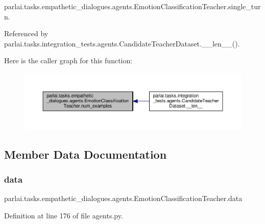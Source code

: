 parlai.\+tasks.\+empathetic\+\_\+dialogues.\+agents.\+Emotion\+Classification\+Teacher.\+single\+\_\+turn.



Referenced by parlai.\+tasks.\+integration\+\_\+tests.\+agents.\+Candidate\+Teacher\+Dataset.\+\_\+\+\_\+len\+\_\+\+\_\+().

Here is the caller graph for this function\+:
\nopagebreak
\begin{figure}[H]
\begin{center}
\leavevmode
\includegraphics[width=350pt]{classparlai_1_1tasks_1_1empathetic__dialogues_1_1agents_1_1EmotionClassificationTeacher_a2421670b1bc496fdfe555208df4452a8_icgraph}
\end{center}
\end{figure}


\subsection{Member Data Documentation}
\mbox{\label{classparlai_1_1tasks_1_1empathetic__dialogues_1_1agents_1_1EmotionClassificationTeacher_af0487bf9a19db59ac3f954463b9031e5}} 
\subsubsection{\texorpdfstring{data}{data}}
{\footnotesize\ttfamily parlai.\+tasks.\+empathetic\+\_\+dialogues.\+agents.\+Emotion\+Classification\+Teacher.\+data}



Definition at line 176 of file agents.\+py.



